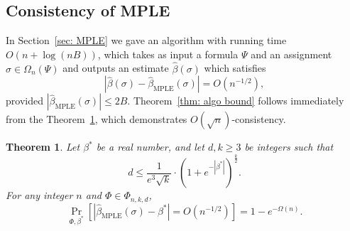 \documentclass[11pt]{article}
\newtheorem{theorem}{Theorem}[section]
\theoremstyle{definition}
\theoremstyle{remark}
\begin{document}
\subsection{Consistency of MPLE}
\label{sec: consistency}
In Section~\ref{sec: MPLE}  we gave an algorithm with running time $O(n + \log(nB) )$, which 
takes as input a formula $\Psi$ and an assignment $\sigma\in\Omega_n(\Psi)$ and outputs an estimate $\hat{\beta}(\sigma)$ 
which  satisfies
\[
\left| \hat{\beta}(\sigma) -\hat{\beta}_{\mathrm{MPLE}}(\sigma) \right| = O(n^{-1/2}),
\]
provided $|\hat{\beta}_{\mathrm{MPLE}}(\sigma)|\le 2B$.
Theorem~\ref{thm: algo bound} follows immediately from the 
Theorem~\ref{thm: consistent}, which demonstrates
$O(\sqrt{n})$-consistency.
\begin{theorem}
    \label{thm: consistent} Let $\beta^*$ be a real number, and let $d,k\geq 3$ be integers such that 
    \begin{equation}
        \label{eq:k/2 condition 2}
        d\le \frac{1}{e^3\sqrt{k}} \cdot (1+e^{-|\beta^*|})^{\frac{k}{2}}.
    \end{equation} 
    For any integer $n$ and $\Phi \in \Phi_{n,k,d}$, 
    \begin{equation}
        \label{eq:consistency}
         \Pr_{\Phi, \beta^*} \left[ 
            \left| 
                \hat{\beta}_{\mathrm{MPLE}}(\sigma) -\beta^*
            \right| = O(n^{-1/2})
         \right] = 1- e^{-\Omega(n)}.
    \end{equation}
\end{theorem}
\end{document}
